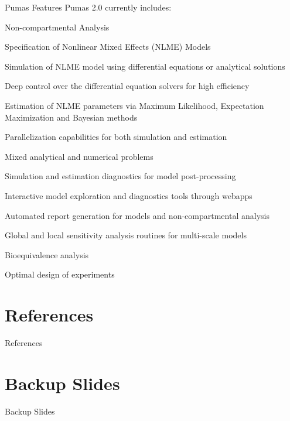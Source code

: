 \documentclass[aspectratio=169]{beamer}                    %
\begin{document}
\begin{frame}{Pumas Features}
	Pumas 2.0 currently includes:
	\begin{vfilleditems}
		\small
		\item Non-compartmental Analysis
		\item Specification of Nonlinear Mixed Effects (NLME) Models
		\item Simulation of NLME model using differential equations or analytical solutions
		\item Deep control over the differential equation solvers for high efficiency
		\item Estimation of NLME parameters via Maximum Likelihood, Expectation Maximization and Bayesian methods
		\item Parallelization capabilities for both simulation and estimation
		\item Mixed analytical and numerical problems
		\item Simulation and estimation diagnostics for model post-processing
		\item Interactive model exploration and diagnostics tools through webapps
		\item Automated report generation for models and non-compartmental analysis
		\item Global and local sensitivity analysis routines for multi-scale models
		\item Bioequivalence analysis
		\item Optimal design of experiments
	\end{vfilleditems}
\end{frame}

\section{References}
\begin{frame}{References}
	\printbibliography
\end{frame}

\appendix %
\section*{Backup Slides}
\begin{frame}
	\centering
	\vfill
	{\fontsize{40}{50}\selectfont Backup Slides}
	\vfill
\end{frame}
\end{document}
